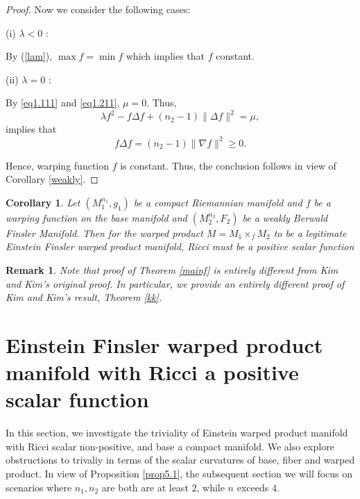 \documentclass[pdflatex,sn-mathphys-num]{sn-jnl}%
\newtheorem{corollary}{Corollary}[section]
\theoremstyle{thmstyleone}%
\theoremstyle{thmstyletwo}%
\newtheorem{remark}{Remark}%
\theoremstyle{thmstylethree}%
\begin{document}
\begin{proof}
	Now we consider the following cases:
	
	(i) $\lambda <0$ :
	
	By (\ref{lam}), $\max f = \min f$ which implies that $f$ constant.
	
	(ii) $\lambda=0$ :
	
	By \eqref{eq1.111} and \eqref{eq1.211}, $\mu=0$.
	Thus,
	\begin{equation}
		\lambda f^2- f\Delta f + (n_2-1)\|\Delta f\|^2= \mu,
	\end{equation}
	implies that	
	\begin{equation}\label{kap}
		f\Delta f = (n_2-1)\|\nabla f\|^2 \ge 0.
	\end{equation}

	Hence, warping function $f$ is constant.
Thus, the conclusion follows in view of Corollary \ref{weakly}.
\end{proof}

	

\begin{corollary}
Let $(M_1^{n_1},g_1)$ be a compact Riemannian manifold
 and  $f$ be a  warping function on the base manifold and $(M_2^{n_2},F_2)$ be a weakly Berwald Finsler Manifold. Then 
 for the warped product $M=M_1\times_f M_2$ to be a legitimate Einstein Finsler warped product 
 manifold, Ricci must be a positive scalar function 
\end{corollary}

\vspace{0.15in}
 

 \begin{remark}
     Note that  proof of Theorem \ref{mainf} is entirely different from Kim and Kim's original proof. In particular, we provide an entirely different  proof of Kim and Kim's result,
     Theorem \ref{kk}.
 \end{remark} 




\section{Einstein Finsler warped product manifold with Ricci a positive scalar function}\label{sec6}
In this section, we investigate the triviality of Einstein warped product manifold with Ricci scalar non-positive, and base a compact manifold. We also explore obstructions to  trivaliy in terms of the scalar curvatures of base, fiber and warped product. In  view of Proposition \ref{prop5.1}, the subsequent section we will focus on scenarios where $n_1,n_2$ are both are at least $2$, while $n$ exceeds $4$.
\end{document}
